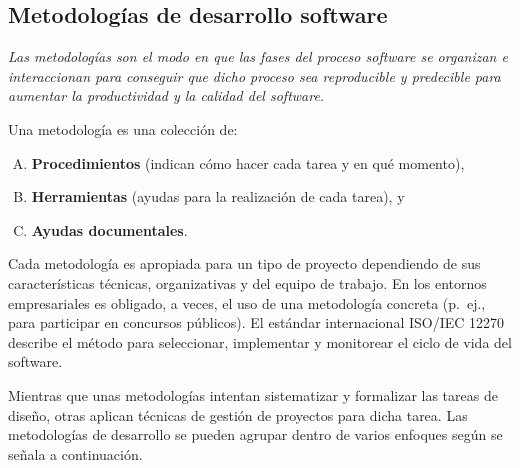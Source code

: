 \subsection{Metodologías de desarrollo software}
\emph{Las metodologías son el modo en que las fases del proceso software se organizan e interaccionan para conseguir que dicho proceso sea reproducible y predecible para aumentar la productividad y la calidad del software.}

\noindent Una metodología es una colección de:

\begin{enumerate}[A.]
\item \textbf{Procedimientos} (indican cómo hacer cada tarea y en qué momento),
\item \textbf{Herramientas} (ayudas para la realización de cada tarea), y
\item \textbf{Ayudas documentales}.
\end{enumerate}

Cada metodología es apropiada para un tipo de proyecto dependiendo de sus características técnicas, organizativas y del equipo de trabajo. En los entornos empresariales es obligado, a veces, el uso de una metodología concreta (p.~ej., para participar en concursos públicos). El estándar internacional ISO/IEC 12270 describe el método para seleccionar, implementar y monitorear el ciclo de vida del software.

Mientras que unas metodologías intentan sistematizar y formalizar las tareas de diseño, otras aplican técnicas de gestión de proyectos para dicha tarea. Las metodologías de desarrollo se pueden agrupar dentro de varios enfoques según se señala a continuación.

